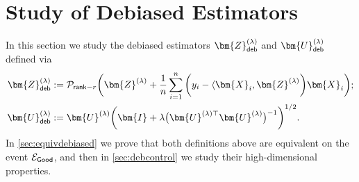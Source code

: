 \documentclass[10pt]{article}
\newcommand{\inv}{^{-1}}
\theoremstyle{definition}
\begin{document}
\section{Study of Debiased Estimators} \label{sec:debequivalence}
In this section we study the debiased estimators $\bm{Z}_{{\sf deb}}^{(\lambda)}$ and $\bm{U}_{{\sf deb}}^{(\lambda)}$ defined via  
\begin{align}
    \bm{Z}^{(\lambda)}_{{\sf deb}} &:= \mathcal{P}_{{\sf rank}-r} \bigg( \bm{Z}^{(\lambda)} + \frac{1}{n} \sum_{i=1}^{n} \bigg( y_i - \langle \bm{X}_i, \bm{Z}^{(\lambda)} \bigg) \bm{X}_i \bigg); \\
    \bm{U}^{(\lambda)}_{{\sf deb}} &:= \bm{U}^{(\lambda)} \bigg( \bm{I} + \lambda \big( \bm{U}^{(\lambda)\top} \bm{U}^{(\lambda)} \big)\inv \bigg)^{1/2}.
\end{align}
In \cref{sec:equivdebiased} we prove that both definitions above are equivalent on the event $\mathcal{E}_{{\sf Good}}$, and then in \cref{sec:debcontrol} we study their high-dimensional properties.  
\end{document}
